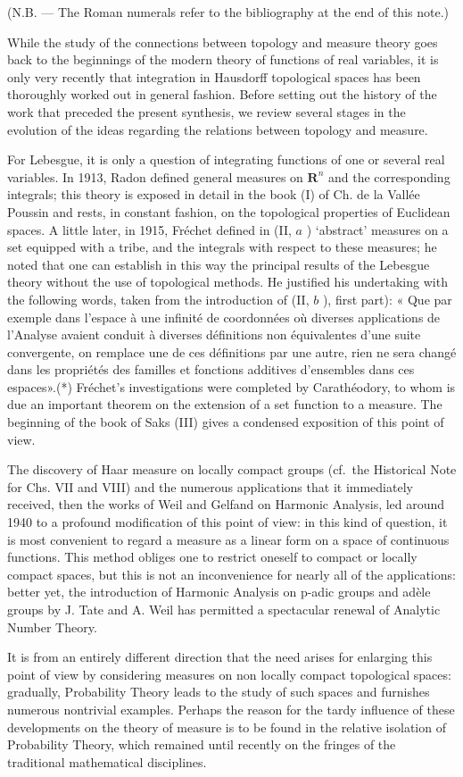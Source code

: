 
(N.B. --- The Roman numerals refer to the bibliography at the end of this note.)

While the study of the connections between topology and measure theory goes back to the beginnings of the modern theory of functions of real variables, it is only very recently that integration in Hausdorff topological spaces has been thoroughly worked out in general fashion. Before setting out the history of the work that preceded the present synthesis, we review several stages in the evolution of the ideas regarding the relations between topology and measure.

For Lebesgue, it is only a question of integrating functions of one or several real variables. In 1913, Radon defined general measures on \(\mathbf{R}^n\) and the corresponding integrals; this theory is exposed in detail in the book (I) of Ch. de la Vallée Poussin and rests, in constant fashion, on the topological properties of Euclidean spaces. A little later, in 1915, Fréchet defined in (II, \(a\) ) `abstract' measures on a set equipped with a tribe, and the integrals with respect to these measures; he noted that one can establish in this way the principal results of the Lebesgue theory without the use of topological methods. He justified his undertaking with the following words, taken from the introduction of (II, \(b\) ), first part): « Que par exemple dans l'espace à une infinité de coordonnées où diverses applications de l'Analyse avaient conduit à diverses définitions non équivalentes d'une suite convergente, on remplace une de ces définitions par une autre, rien ne sera changé dans les propriétés des familles et fonctions additives d'ensembles dans ces espaces».(*) Fréchet's investigations were completed by Carathéodory, to whom is due an important theorem on the extension of a set function to a measure. The beginning of the book of Saks (III) gives a condensed exposition of this point of view.

The discovery of Haar measure on locally compact groups (cf.~the Historical Note for Chs. VII and VIII) and the numerous applications that it immediately received, then the works of Weil and Gelfand on Harmonic Analysis, led around 1940 to a profound modification of this point of view: in this kind of question, it is most convenient to regard a measure as a linear form on a space of continuous functions. This method obliges one to restrict oneself to compact or locally compact spaces, but this is not an inconvenience for nearly all of the applications: better yet, the introduction of Harmonic Analysis on p-adic groups and adèle groups by J. Tate and A. Weil has permitted a spectacular renewal of Analytic Number Theory.

It is from an entirely different direction that the need arises for enlarging this point of view by considering measures on non locally compact topological spaces: gradually, Probability Theory leads to the study of such spaces and furnishes numerous nontrivial examples. Perhaps the reason for the tardy influence of these developments on the theory of measure is to be found in the relative isolation of Probability Theory, which remained until recently on the fringes of the traditional mathematical disciplines.

